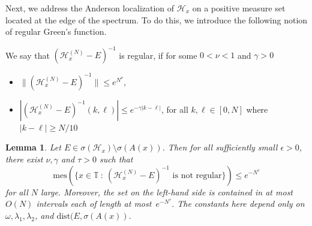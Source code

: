 \documentclass[11pt]{amsart}
\newtheorem{lemma}[theorem]{Lemma}
\def\mes{\mathrm{mes}}
\def\calH{\mathcal{H}}
\def\tor{\mathbb{T}}
\def\dist{\mathrm{dist}}
\begin{document}
 Next, we address the Anderson localization of $\calH_x$ on a positive measure set located at the edge of the spectrum.
 To do this, we introduce the following notion of regular Green's function.
 
     We say that $(\calH^{(N)}_x-E)^{-1}$ is regular, if for some $0<\nu<1$ and $\gamma>0$
    \begin{itemize}
        \item $\| (\calH^{(N)}_x-E)^{-1}\|\le e^{N^\nu}$, 
        \item $|(\calH^{(N)}_x-E)^{-1}(k,\ell)|\le e^{-\gamma|k-\ell|}$, for all $k,\ell\in [0,N]$ where $|k-\ell|\ge N/10$
    \end{itemize}
 
     
    \begin{lemma}
        \label{lem:calHreg}
        Let $E\in \sigma(\calH_x)\setminus\sigma(A(x))$.  Then  for all sufficiently small $\epsilon>0$, there exist $\nu,\gamma$ and  $\tau>0$ such that 
        \[
        \mes(\{x\in\tor\::\: (\calH^{(N)}_x-E)^{-1} \text{\ \ is not regular} \})\le e^{-N^\tau}
        \]
        for all $N$ large. Moreover, the set on the left-hand side is contained in  at most $O(N)$ intervals each of length at most~$e^{-N^\tau}$. The constants here depend only on $\omega, \lambda_1,\lambda_2$, and $\dist(E,\sigma(A(x))$.
    \end{lemma}
\end{document}
